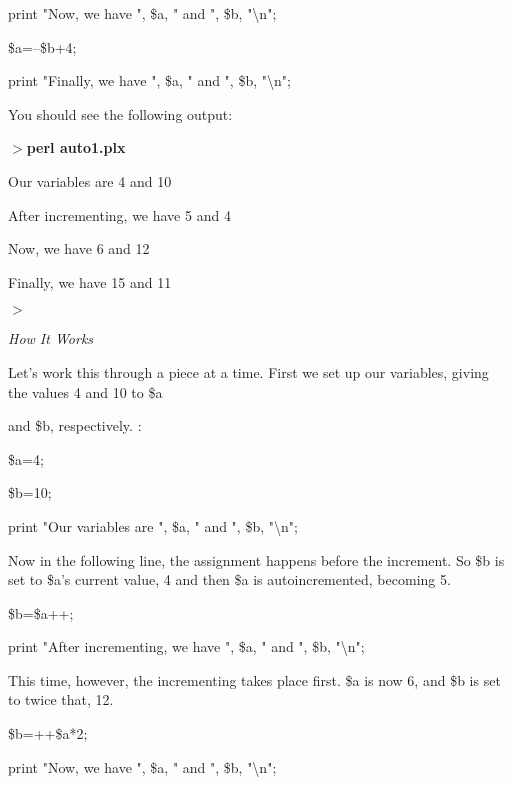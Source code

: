 \documentclass[a4paper,11pt]{book}
\begin{document}
\noindent print "Now, we have ", \$a, " and ", \$b, "\textbackslash n";

\noindent \$a=--\$b+4;

\noindent print "Finally, we have ", \$a, " and ", \$b, "\textbackslash n";

\noindent 

\noindent You should see the following output:

\noindent 

\noindent $>$\textbf{perl auto1.plx}

\noindent Our variables are 4 and 10

\noindent After incrementing, we have 5 and 4

\noindent Now, we have 6 and 12

\noindent Finally, we have 15 and 11

\noindent $>$

\noindent 

\noindent \textit{How It Works}

\noindent Let's work this through a piece at a time. First we set up our variables, giving the values 4 and 10 to \$a

\noindent and \$b, respectively. :

\noindent 

\noindent 

\noindent \$a=4;

\noindent \$b=10;

\noindent print "Our variables are ", \$a, " and ", \$b, "\textbackslash n";

\noindent 

\noindent Now in the following line, the assignment happens before the increment. So \$b is set to \$a's current value, 4 and then \$a is autoincremented, becoming 5.

\noindent 

\noindent 

\noindent \$b=\$a++;

\noindent print "After incrementing, we have ", \$a, " and ", \$b, "\textbackslash n";

\noindent 

\noindent This time, however, the incrementing takes place first. \$a is now 6, and \$b is set to twice that, 12.

\noindent 

\noindent 

\noindent \$b=++\$a*2;

\noindent print "Now, we have ", \$a, " and ", \$b, "\textbackslash n";
\end{document}
